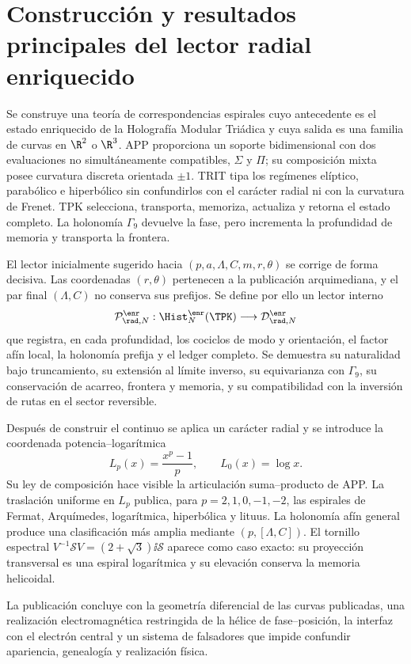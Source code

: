 \part{Construcción y resultados principales del lector radial enriquecido}
Se construye una teoría de correspondencias espirales cuyo antecedente es
el estado enriquecido de la Holografía Modular Triádica y cuya salida es una
familia de curvas en \(\R^2\) o \(\R^3\). APP proporciona un soporte
bidimensional con dos evaluaciones no simultáneamente compatibles,
\(\Sigma\) y \(\Pi\); su composición mixta posee curvatura discreta
orientada \(\pm1\). TRIT tipa los regímenes elíptico, parabólico e
hiperbólico sin confundirlos con el carácter radial ni con la curvatura de
Frenet. TPK selecciona, transporta, memoriza, actualiza y retorna el estado
completo. La holonomía \(\Gamma_9\) devuelve la fase, pero incrementa la
profundidad de memoria y transporta la frontera.

El lector inicialmente sugerido hacia
\((p,a,\Lambda,C,m,r,\theta)\) se corrige de forma decisiva. Las
coordenadas \((r,\theta)\) pertenecen a la publicación arquimediana, y el
par final \((\Lambda,C)\) no conserva sus prefijos. Se define por ello un
lector interno
\[
 \mathcal P^{\enr}_{\rad,N}:\Hist_N^{\enr}(\TPK)
 \longrightarrow \mathcal D^{\enr}_{\rad,N}
\]
que registra, en cada profundidad, los cociclos de modo y orientación, el
factor afín local, la holonomía prefija y el ledger completo. Se demuestra
su naturalidad bajo truncamiento, su extensión al límite inverso, su
equivarianza con \(\Gamma_9\), su conservación de acarreo, frontera y
memoria, y su compatibilidad con la inversión de rutas en el sector
reversible.

Después de construir el continuo se aplica un carácter radial y se introduce
la coordenada potencia--logarítmica
\[
 L_p(x)=\frac{x^p-1}{p},\qquad L_0(x)=\log x.
\]
Su ley de composición hace visible la articulación suma--producto de APP.
La traslación uniforme en \(L_p\) publica, para
\(p=2,1,0,-1,-2\), las espirales de Fermat, Arquímedes, logarítmica,
hiperbólica y lituus. La holonomía afín general produce una clasificación
más amplia mediante \((p,[\Lambda,C])\). El tornillo espectral
\(V^{-1}\mathscr SV=(2+\sqrt3)\ii\mathscr S\) aparece como caso exacto:
su proyección transversal es una espiral logarítmica y su elevación conserva
la memoria helicoidal.

La publicación concluye con la geometría diferencial de las curvas
publicadas, una realización electromagnética restringida de la hélice de
fase--posición, la interfaz con el electrón central y un sistema de
falsadores que impide confundir apariencia, genealogía y realización
física.

